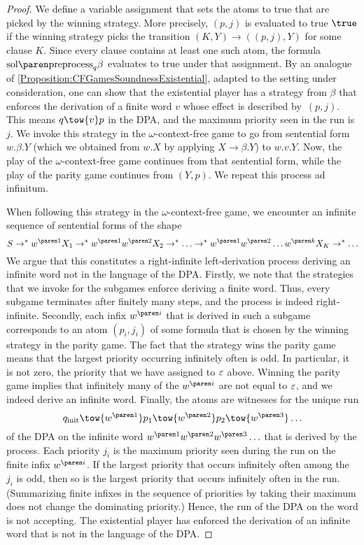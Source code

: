 \documentclass[../../diss.tex]{subfiles}
\begin{document}
\begin{proof}
    We define a variable assignment that sets the atoms to true that are picked by the winning strategy.
    More precisely, $(p,j)$ is evaluated to true $\true$ if the winning strategy picks the transition $(K,Y) \to ((p,j),Y)$ for some clause $K$.
    Since every clause contains at least one such atom, the formula $\sol{\text{preprocess}_q{\beta}}$ evaluates to true under that assignment.
    By an analogue of \cref{Proposition:CFGamesSoundnessExistential}, adapted to the setting under consideration, one can show that the existential player has a strategy from $\beta$ that enforces the derivation of a finite word $v$ whose effect is described by~$(p,j)$.
    This means $q \tow{v} p$ in the DPA, and the maximum priority seen in the run is $j$.
    We invoke this strategy in the $\omega$-context-free game to go from sentential form $w.\beta.Y$ (which we obtained from $w.X$ by applying $X \to \beta.Y$) to $w.v.Y$.
    Now, the play of the $\omega$-context-free game continues from that sentential form, while the play of the parity game continues from $(Y,p)$.
    We repeat this process ad infinitum.

    When following this strategy in the $\omega$-context-free game, we encounter an infinite sequence of sentential forms of the shape
    \[
        S \to^* \itr{w}{1}X_1  \to^* \itr{w}{1}\itr{w}{2} X_2 \to^* \ldots \to^* \itr{w}{1}\itr{w}{2}\ldots\itr{w}{k} X_K \to^* \ldots
    \]
    We argue that this constitutes a right-infinite left-derivation process deriving an infinite word not in the language of the DPA.\@
    Firstly, we note that the strategies that we invoke for the subgames enforce deriving a finite word.
    Thus, every subgame terminates after finitely many steps, and the process is indeed right-infinite.
    Secondly, each infix $\itr{w}{i}$ that is derived in such a subgame corresponds to an atom $(p_i,j_i)$ of some formula that is chosen by the winning strategy in the parity game.
    The fact that the strategy wins the parity game means that the largest priority occurring infinitely often is odd.
    In particular, it is not zero, the priority that we have assigned to $\varepsilon$ above.
    Winning the parity game implies that infinitely many of the $\itr{w}{i}$ are not equal to $\varepsilon$, and we indeed derive an infinite word.
    Finally, the atoms are witnesses for the unique run
    \[
        \qinit \tow{ \itr{w}{1}} p_1 \tow{ \itr{w}{2}} p_2 \tow{ \itr{w}{3}} \ldots
    \]
    of the DPA on the infinite word $\itr{w}{1}\itr{w}{2}\itr{w}{3} \ldots $ that is derived by the process.
    Each priority $j_i$ is the maximum priority seen during the run on the finite infix $\itr{w}{i}$.
    If the largest priority that occurs infinitely often among the $j_i$ is odd, then so is the largest priority that occurs infinitely often in the run.
    (Summarizing finite infixes in the sequence of priorities by taking their maximum does not change the dominating priority.)
    Hence, the run of the DPA on the word is not accepting.
    The existential player has enforced the derivation of an infinite word that is not in the language of the DPA.\@
\end{proof}
\end{document}
